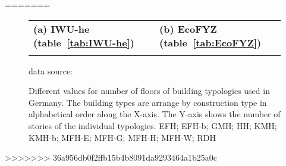 =======
\begin{figure}[htb]
\centering

\hspace{-2.5cm}
  \begin{tabular}{p{0.5\linewidth} p{0.5\linewidth} }

\textbf{(a) IWU-he (table~\ref{tab:IWU-he})}&
\textbf{(b) EcoFYZ (table~\ref{tab:EcoFYZ})}
\\
\vspace{-2cm}

&
\vspace{-2cm}
\\
  \end{tabular}
\vspace{-1.4cm}

\begin{flushright}
\footnotesize{data source:~\cite{Born.2003,Hermelink.2011}}
\end{flushright}
	\caption[Different values for number of floors of building typologies used in
	Germany.]{Different values for number of floors of building typologies used in
	Germany.
	The building types are arrange by construction type in alphabetical order along
	the X-axis.
	The Y-axis shows the number of stories of the individual typologies.
	EFH; EFH-b; GMH; HH; KMH; KMH-b; MFH-E; MFH-G; MFH-H; MFH-W; RDH}
	\label{fig:DifTypFloor}
\end{figure}
>>>>>>> 36a956db0f2ffb15b4b8091da9293464a1b25a0c